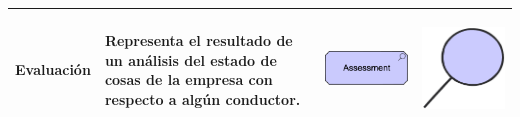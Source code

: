 \begin{longtable}{|p{0.15\linewidth}|p{0.45\linewidth}|p{0.2\linewidth} p{0.2\linewidth}|}
    Evaluación &
    Representa el resultado de un análisis del estado de cosas de la empresa con respecto a algún conductor. &
\begin{center}
    \includegraphics[width=1\linewidth]{imgs/capa_motivacional/assessment1.pdf}
\end{center} &
\begin{center}
    \includegraphics[width=0.5\linewidth]{imgs/capa_motivacional/assessment2.pdf}
\end{center}
    \\ \hline


\end{longtable}
